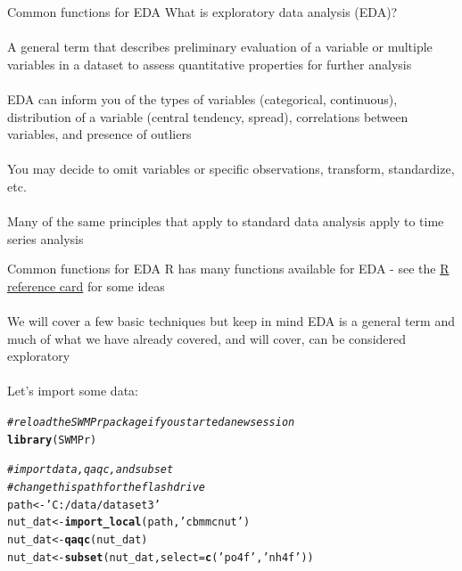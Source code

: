 \documentclass[xcolor=svgnames]{beamer}\usepackage[]{graphicx}\usepackage[]{color}
\makeatletter
\newcommand{\hlstr}[1]{\textcolor[rgb]{0.192,0.494,0.8}{#1}}%
\newcommand{\hlcom}[1]{\textcolor[rgb]{0.678,0.584,0.686}{\textit{#1}}}%
\newcommand{\hlstd}[1]{\textcolor[rgb]{0.345,0.345,0.345}{#1}}%
\newcommand{\hlkwb}[1]{\textcolor[rgb]{0.69,0.353,0.396}{#1}}%
\newcommand{\hlkwc}[1]{\textcolor[rgb]{0.333,0.667,0.333}{#1}}%
\newcommand{\hlkwd}[1]{\textcolor[rgb]{0.737,0.353,0.396}{\textbf{#1}}}%
\newenvironment{kframe}{%
 \def\at@end@of@kframe{}%
 \ifinner\ifhmode%
  \def\at@end@of@kframe{\end{minipage}}%
  \begin{minipage}{\columnwidth}%
 \fi\fi%
 \def\FrameCommand##1{\hskip\@totalleftmargin \hskip-\fboxsep
 \colorbox{shadecolor}{##1}\hskip-\fboxsep
     \hskip-\linewidth \hskip-\@totalleftmargin \hskip\columnwidth}%
 \MakeFramed {\advance\hsize-\width
   \@totalleftmargin\z@ \linewidth\hsize
   \@setminipage}}%
 {\par\unskip\endMakeFramed%
 \at@end@of@kframe}
\newenvironment{knitrout}{}{} %
\makeatother
\begin{document}
\begin{frame}{Common functions for EDA}
What is exploratory data analysis (EDA)? \\~\\
A general term that describes preliminary evaluation of a variable or multiple variables in a dataset to assess quantitative properties for further analysis\\~\\
EDA can inform you of the \alert{types} of variables (categorical, continuous), \alert{distribution} of a variable (central tendency, spread), \alert{correlations} between variables, and presence of \alert{outliers} \\~\\
You may decide to omit variables or specific observations, transform, standardize, etc.\\~\\
Many of the same principles that apply to standard data analysis apply to time series analysis
\end{frame}

\begin{frame}[containsverbatim]{Common functions for EDA}
R has many functions available for EDA - see the \href{http://cran.r-project.org/doc/contrib/Short-refcard.pdf}{R reference card} for some ideas\\~\\
We will cover a few basic techniques but keep in mind EDA is a general term and much of what we have already covered, and will cover, can be considered exploratory \\~\\
Let's import some data:

\begin{knitrout}\scriptsize
{}\color{fgcolor}\begin{kframe}
\begin{alltt}
\hlcom{# reload the SWMPr package if you started a new session}
\hlkwd{library}\hlstd{(SWMPr)}

\hlcom{# import data, qaqc, and subset}
\hlcom{# change this path for the flash drive}
\hlstd{path} \hlkwb{<-} \hlstr{'C:/data/dataset3'}
\hlstd{nut_dat} \hlkwb{<-} \hlkwd{import_local}\hlstd{(path,} \hlstr{'cbmmcnut'}\hlstd{)}
\hlstd{nut_dat} \hlkwb{<-} \hlkwd{qaqc}\hlstd{(nut_dat)}
\hlstd{nut_dat} \hlkwb{<-} \hlkwd{subset}\hlstd{(nut_dat,} \hlkwc{select} \hlstd{=} \hlkwd{c}\hlstd{(}\hlstr{'po4f'}\hlstd{,} \hlstr{'nh4f'}\hlstd{))}
\end{alltt}
\end{kframe}
\end{knitrout}
\end{frame}
\end{document}
